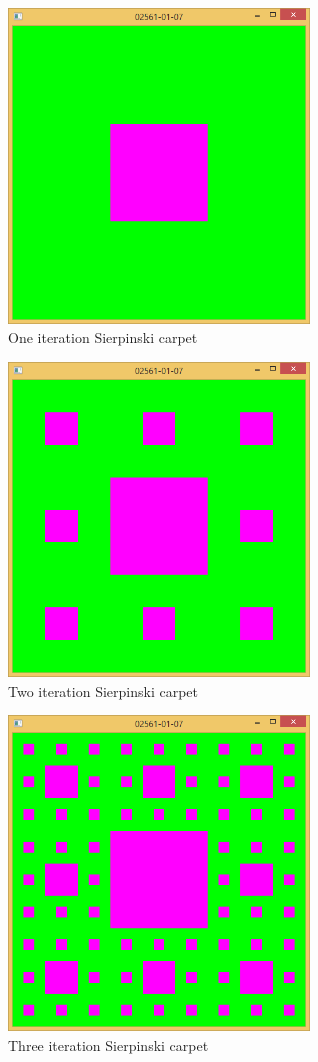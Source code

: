 \begin{figure}[hp]
\centering
\includegraphics[width=8cm]{../Screenshots/ex-1/7-1.png}
\caption{One iteration Sierpinski carpet}
\label{fig:1-7-1}
\end{figure}

\begin{figure}[hp]
\centering
\includegraphics[width=8cm]{../Screenshots/ex-1/7-2.png}
\caption{Two iteration Sierpinski carpet}
\label{fig:1-7-2}
\end{figure}

\begin{figure}[hp]
\centering
\includegraphics[width=8cm]{../Screenshots/ex-1/7-3.png}
\caption{Three iteration Sierpinski carpet}
\label{fig:1-7-3}
\end{figure}



